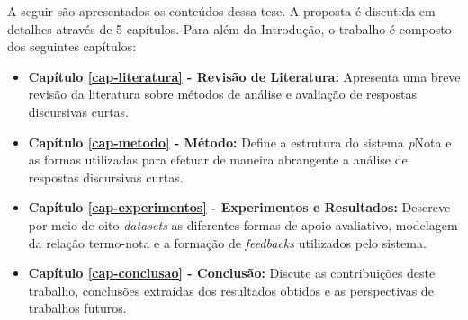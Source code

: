 A seguir são apresentados os conteúdos dessa tese. A proposta é discutida em detalhes através de 5 capítulos. Para além da Introdução, o trabalho é composto dos seguintes capítulos:

\begin{itemize}
\item \textbf{Capítulo \ref{cap-literatura} - Revisão de Literatura:} Apresenta uma breve revisão da literatura sobre métodos de análise e avaliação de respostas discursivas curtas.

\item \textbf{Capítulo \ref{cap-metodo} - Método:} Define a estrutura do sistema \textit{p}Nota e as formas utilizadas para efetuar de maneira abrangente a análise de respostas discursivas curtas.

\item \textbf{Capítulo \ref{cap-experimentos} - Experimentos e Resultados:} Descreve por meio de oito \textit{datasets} as diferentes formas de apoio avaliativo, modelagem da relação termo-nota e a formação de \textit{feedbacks} utilizados pelo sistema.

\item \textbf{Capítulo \ref{cap-conclusao} - Conclusão:} Discute as contribuições deste trabalho, conclusões extraídas dos resultados obtidos e as perspectivas de trabalhos futuros.

\end{itemize}